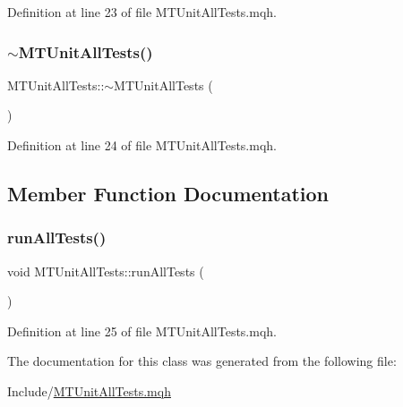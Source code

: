 Definition at line 23 of file M\+T\+Unit\+All\+Tests.\+mqh.

\mbox{\label{class_m_t_unit_all_tests_a2d9dccb31b2ce7cd3dc164c0c9c79c8c}} 
\subsubsection{\texorpdfstring{$\sim$\+M\+T\+Unit\+All\+Tests()}{~MTUnitAllTests()}}
{\footnotesize\ttfamily M\+T\+Unit\+All\+Tests\+::$\sim$\+M\+T\+Unit\+All\+Tests (\begin{DoxyParamCaption}{ }\end{DoxyParamCaption})\hspace{0.3cm}{\ttfamily [inline]}}



Definition at line 24 of file M\+T\+Unit\+All\+Tests.\+mqh.



\subsection{Member Function Documentation}
\mbox{\label{class_m_t_unit_all_tests_acb555e1d5ff6afa8a5fdbf097abe70f5}} 
\subsubsection{\texorpdfstring{run\+All\+Tests()}{runAllTests()}}
{\footnotesize\ttfamily void M\+T\+Unit\+All\+Tests\+::run\+All\+Tests (\begin{DoxyParamCaption}{ }\end{DoxyParamCaption})\hspace{0.3cm}{\ttfamily [inline]}}



Definition at line 25 of file M\+T\+Unit\+All\+Tests.\+mqh.



The documentation for this class was generated from the following file\+:\begin{DoxyCompactItemize}
\item 
Include/\mbox{\hyperlink{_m_t_unit_all_tests_8mqh}{M\+T\+Unit\+All\+Tests.\+mqh}}\end{DoxyCompactItemize}
